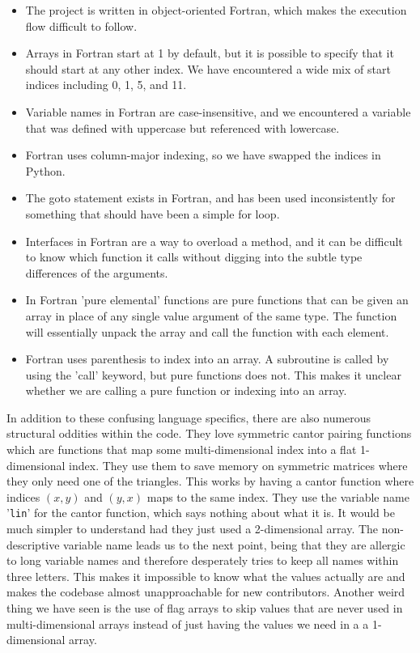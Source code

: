 \begin{itemize}
        \item The project is written in object-oriented Fortran, which makes the execution flow difficult to follow.
        \item Arrays in Fortran start at 1 by default, but it is possible to specify that it should start at any other index. We have encountered a wide mix of start indices including 0, 1, 5, and 11.
        \item Variable names in Fortran are case-insensitive, and we encountered a variable that was defined with uppercase but referenced with lowercase.
        \item Fortran uses column-major indexing, so we have swapped the indices in Python.
        \item The goto statement exists in Fortran, and has been used inconsistently for something that should have been a simple for loop.
        \item Interfaces in Fortran are a way to overload a method, and it can be difficult to know which function it calls without digging into the subtle type differences of the arguments.
        \item In Fortran 'pure elemental' functions are pure functions that can be given an array in place of any single value argument of the same type. The function will essentially unpack the array and call the function with each element.
        \item Fortran uses parenthesis to index into an array. A subroutine is called by using the 'call' keyword, but pure functions does not. This makes it unclear whether we are calling a pure function or indexing into an array.
\end{itemize}

In addition to these confusing language specifics, there are also numerous structural oddities within the code. They love symmetric cantor pairing functions which are functions that map some multi-dimensional index into a flat 1-dimensional index. They use them to save memory on symmetric matrices where they only need one of the triangles. This works by having a cantor function where indices $(x,y)$ and $(y,x)$ maps to the same index. They use the variable name '\verb|lin|' for the cantor function, which says nothing about what it is. It would be much simpler to understand had they just used a 2-dimensional array.
The non-descriptive variable name leads us to the next point, being that they are allergic to long variable names and therefore desperately tries to keep all names within three letters. This makes it impossible to know what the values actually are and makes the codebase almost unapproachable for new contributors.
Another weird thing we have seen is the use of flag arrays to skip values that are never used in multi-dimensional arrays instead of just having the values we need in a a 1-dimensional array.

